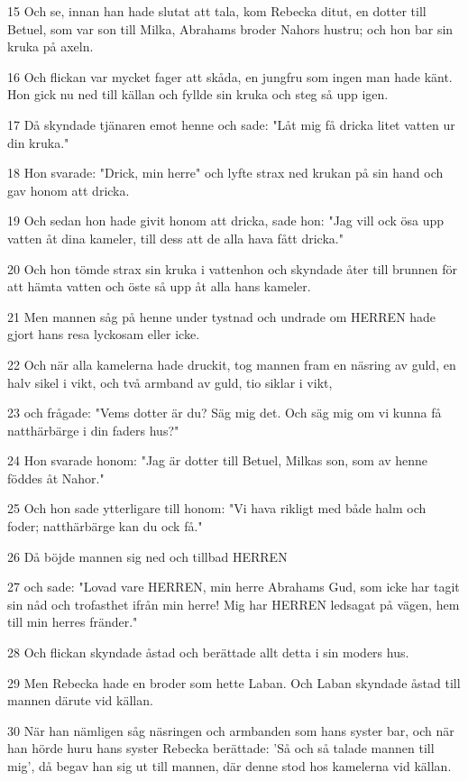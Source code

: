 \par 15 Och se, innan han hade slutat att tala, kom Rebecka ditut, en dotter till Betuel, som var son till Milka, Abrahams broder Nahors hustru; och hon bar sin kruka på axeln.
\par 16 Och flickan var mycket fager att skåda, en jungfru som ingen man hade känt. Hon gick nu ned till källan och fyllde sin kruka och steg så upp igen.
\par 17 Då skyndade tjänaren emot henne och sade: "Låt mig få dricka litet vatten ur din kruka."
\par 18 Hon svarade: "Drick, min herre" och lyfte strax ned krukan på sin hand och gav honom att dricka.
\par 19 Och sedan hon hade givit honom att dricka, sade hon: "Jag vill ock ösa upp vatten åt dina kameler, till dess att de alla hava fått dricka."
\par 20 Och hon tömde strax sin kruka i vattenhon och skyndade åter till brunnen för att hämta vatten och öste så upp åt alla hans kameler.
\par 21 Men mannen såg på henne under tystnad och undrade om HERREN hade gjort hans resa lyckosam eller icke.
\par 22 Och när alla kamelerna hade druckit, tog mannen fram en näsring av guld, en halv sikel i vikt, och två armband av guld, tio siklar i vikt,
\par 23 och frågade: "Vems dotter är du? Säg mig det. Och säg mig om vi kunna få natthärbärge i din faders hus?"
\par 24 Hon svarade honom: "Jag är dotter till Betuel, Milkas son, som av henne föddes åt Nahor."
\par 25 Och hon sade ytterligare till honom: "Vi hava rikligt med både halm och foder; natthärbärge kan du ock få."
\par 26 Då böjde mannen sig ned och tillbad HERREN
\par 27 och sade: "Lovad vare HERREN, min herre Abrahams Gud, som icke har tagit sin nåd och trofasthet ifrån min herre! Mig har HERREN ledsagat på vägen, hem till min herres fränder."
\par 28 Och flickan skyndade åstad och berättade allt detta i sin moders hus.
\par 29 Men Rebecka hade en broder som hette Laban. Och Laban skyndade åstad till mannen därute vid källan.
\par 30 När han nämligen såg näsringen och armbanden som hans syster bar, och när han hörde huru hans syster Rebecka berättade: 'Så och så talade mannen till mig', då begav han sig ut till mannen, där denne stod hos kamelerna vid källan.
